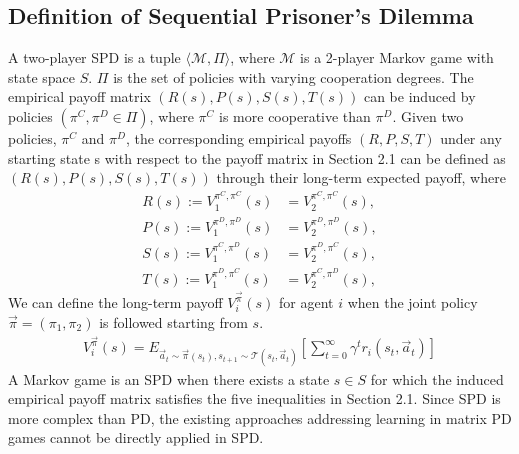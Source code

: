 \documentclass{article}
\begin{document}
\subsection{Definition of Sequential Prisoner's Dilemma}
A two-player SPD is a tuple $\langle \mathcal{M}, \Pi \rangle$, where $\mathcal{M}$ is a 2-player Markov game with state space $S$. $\Pi$ is the set of policies with varying cooperation degrees. The empirical payoff matrix $(R(s), P(s), S(s), T(s))$ can be induced by policies $(\pi^C, \pi^D \in \Pi)$, where $\pi^C$ is more cooperative than $\pi^D$. Given two policies, $\pi^C$ and $\pi^D$, the corresponding empirical payoffs $(R, P, S, T)$ under any starting state s with respect to the payoff matrix in Section 2.1 can be defined as $(R(s), P(s), S(s), T(s))$ through their long-term expected payoff, where
\begin{eqnarray}
R(s) := V_1^{\pi^C, \pi^C} (s) & = V_2^{\pi^C, \pi^C}(s), \\
P(s) := V_1^{\pi^D, \pi^D} (s) & = V_2^{\pi^D, \pi^D}(s), \\
S(s) := V_1^{\pi^C, \pi^D} (s) & = V_2^{\pi^D, \pi^C}(s), \\
T(s) := V_1^{\pi^D, \pi^C} (s) & = V_2^{\pi^C, \pi^D}(s),
\end{eqnarray}
We can define the long-term payoff $V_i^{\vec \pi}(s)$ for agent $i$ when the joint policy $\vec \pi = (\pi_1, \pi_2)$ is followed starting from $s$.
\begin{eqnarray}
V_i^{\vec \pi}(s) = E_{\vec a_t \sim \vec \pi(s_t),s_{t+1} \sim \mathcal{T}(s_t,\vec a_t)}[\sum_{t=0}^{\infty} \gamma^t r_i(s_t,\vec a_t)]
\end{eqnarray}
A Markov game is an SPD when there exists a state $s \in S$ for which the induced empirical payoff matrix satisfies the five inequalities in Section 2.1. Since SPD is more complex than PD, the existing approaches addressing learning in matrix PD games cannot be directly applied in SPD.
\end{document}
